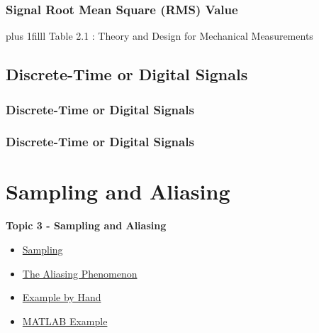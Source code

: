 \documentclass[fleqn]{beamer} %
\newcommand{\sectionIIItitle}{Sampling and Aliasing}
\newcommand{\sectionIIsubsectionIIItitle}{Signal Root Mean Square (RMS) Value}
\newcommand{\sectionIIsubsectionIVtitle}{Discrete-Time or Digital Signals}
\newcommand{\sectionIIIsubsectionItitle}{Sampling}
\newcommand{\sectionIIIsubsectionIItitle}{The Aliasing Phenomenon}
\newcommand{\sectionIIIsubsectionIIItitle}{Example by Hand}
\newcommand{\sectionIIIsubsectionIVtitle}{MATLAB Example}
\newcommand{\btVFill}{\vskip0pt plus 1filll}
\begin{document}
			\begin{frame}
			\frametitle{\sectionIIsubsectionIIItitle}




\btVFill
\tiny{Table 2.1 : Theory and Design for Mechanical Measurements}	



			\end{frame}

		\subsection{\sectionIIsubsectionIVtitle}\label{sectionIIsubsectionIV}

			\begin{frame}
				\frametitle{\sectionIIsubsectionIVtitle}


			\end{frame}

			\begin{frame}
				\frametitle{\sectionIIsubsectionIVtitle}


			\end{frame}
		
	\section{\sectionIIItitle}\label{sectionIII}

		\begin{frame}
			\large \textbf{Topic 3 - \sectionIIItitle} \vspace{3mm}\\

			\begin{itemize}
				\item \hyperlink{sectionIIIsubsectionI}{\sectionIIIsubsectionItitle} \vspc %
				\item \hyperlink{sectionIIIsubsectionII}{\sectionIIIsubsectionIItitle} \vspc %
				\item \hyperlink{sectionIIIsubsectionIII}{\sectionIIIsubsectionIIItitle} \vspc %
				\item \hyperlink{sectionIIIsubsectionIV}{\sectionIIIsubsectionIVtitle} \vspc %
			\end{itemize}

		\end{frame}

\end{document}
